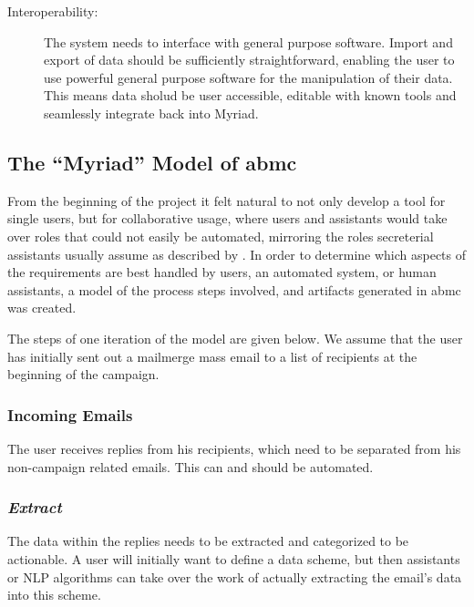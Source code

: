 \begin{description}

\item[Interoperability:] The system needs to interface with general purpose software. Import and export of data should be sufficiently straightforward, enabling the user to use powerful general purpose software for the manipulation of their data. This means data sholud be user accessible, editable with known tools and seamlessly integrate back into Myriad.

\end{description}

\subsection{The ``Myriad'' Model of \gls{abmc}}

From the beginning of the project it felt natural to not only develop a tool for single users, but for collaborative usage, where users and assistants would take over roles that could not easily be automated, mirroring the roles secreterial assistants usually assume as described by \citet{Erickson2008a}.
In order to determine which aspects of the requirements are best handled by users, an automated system, or human assistants, a model of the process steps involved, and artifacts generated in \gls{abmc} was created.


The steps of one iteration of the model are given below. We assume that the user has initially sent out a mailmerge mass email to a list of recipients at the beginning of the campaign.

\subsubsection*{Incoming Emails}

The user receives replies from his recipients, which need to be separated from his non-campaign related emails. This can and should be automated.

\subsubsection*{\emph{Extract}}

The data within the replies needs to be extracted and categorized to be actionable. A user will initially want to define a data scheme, but then assistants or NLP algorithms can take over the work of actually extracting the email's data into this scheme.

